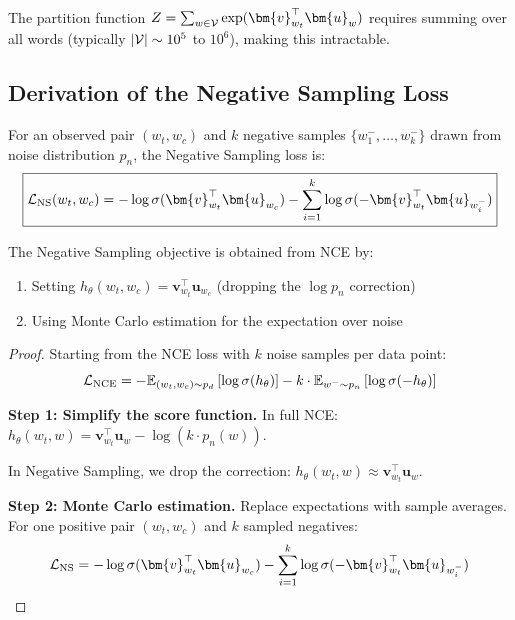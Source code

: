 \begin{notechapter}
The partition function $Z = \sum_{w \in \vocab} \exp(\bm{v}_{w_t}^\top \bm{u}_w)$ requires summing over all words (typically $|\mathcal{V}| \sim 10^5$ to $10^6$), making this intractable.

\subsection{Derivation of the Negative Sampling Loss}

\begin{definition}
For an observed pair $(w_t, w_c)$ and $k$ negative samples $\{w_1^-, \ldots, w_k^-\}$ drawn from noise distribution $p_n$, the Negative Sampling loss is:
\begin{equation}
\boxed{
\loss_{\text{NS}}(w_t, w_c) = -\log \sigmoid(\bm{v}_{w_t}^\top \bm{u}_{w_c}) - \sum_{i=1}^{k} \log \sigmoid(-\bm{v}_{w_t}^\top \bm{u}_{w_i^-})
}
\end{equation}
\end{definition}

\begin{theorem}
\label{contrastive-rigorous:thm:ns_nce}
The Negative Sampling objective is obtained from NCE by:
\begin{enumerate}[label=(\roman*)]
    \item Setting $h_\theta(w_t, w_c) = \bm{v}_{w_t}^\top \bm{u}_{w_c}$ (dropping the $\log p_n$ correction)
    \item Using Monte Carlo estimation for the expectation over noise
\end{enumerate}
\end{theorem}

\begin{proof}
Starting from the NCE loss with $k$ noise samples per data point:
\begin{equation}
\mathcal{L}_{\text{NCE}} = -\mathbb{E}_{(w_t, w_c) \sim p_d}\left[\log \sigma(h_\theta)\right] - k \cdot \mathbb{E}_{w^- \sim p_n}\left[\log \sigma(-h_\theta)\right]
\end{equation}

\textbf{Step 1: Simplify the score function.} 
In full NCE: $h_\theta(w_t, w) = \bm{v}_{w_t}^\top \bm{u}_w - \log(k \cdot p_n(w))$.

In Negative Sampling, we drop the correction: $h_\theta(w_t, w) \approx \bm{v}_{w_t}^\top \bm{u}_w$.

\textbf{Step 2: Monte Carlo estimation.}
Replace expectations with sample averages. For one positive pair $(w_t, w_c)$ and $k$ sampled negatives:
\begin{equation}
\loss_{\text{NS}} = -\log \sigmoid(\bm{v}_{w_t}^\top \bm{u}_{w_c}) - \sum_{i=1}^{k} \log \sigmoid(-\bm{v}_{w_t}^\top \bm{u}_{w_i^-})
\end{equation}
\end{proof}


\end{notechapter}
